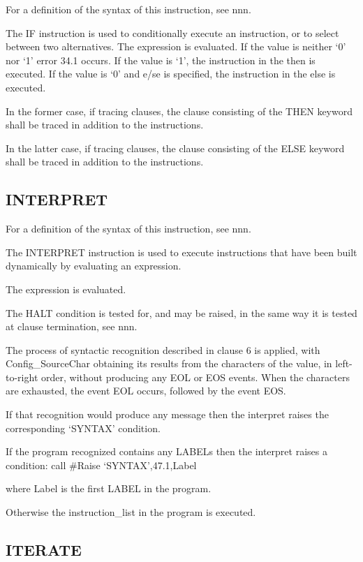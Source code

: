 For a definition of the syntax of this instruction, see nnn.

The IF instruction is used to conditionally execute an instruction, or
to select between two alternatives. The expression is evaluated. If the
value is neither `0' nor `1' error 34.1 occurs. If the value is `1', the
instruction in the then is executed. If the value is `0' and e/se is
specified, the instruction in the else is executed.

In the former case, if tracing clauses, the clause consisting of the
THEN keyword shall be traced in addition to the instructions.

In the latter case, if tracing clauses, the clause consisting of the
ELSE keyword shall be traced in addition to the instructions.

\hypertarget{interpret}{%
\subsection{INTERPRET}\label{interpret}}

For a definition of the syntax of this instruction, see nnn.

The INTERPRET instruction is used to execute instructions that have been
built dynamically by evaluating an expression.

The expression is evaluated.

The HALT condition is tested for, and may be raised, in the same way it
is tested at clause termination, see nnn.

The process of syntactic recognition described in clause 6 is applied,
with Config\_SourceChar obtaining its results from the characters of the
value, in left-to-right order, without producing any EOL or EOS events.
When the characters are exhausted, the event EOL occurs, followed by the
event EOS.

If that recognition would produce any message then the interpret raises
the corresponding `SYNTAX' condition.

If the program recognized contains any LABELs then the interpret raises
a condition: call \#Raise `SYNTAX',47.1,Label

where Label is the first LABEL in the program.

Otherwise the instruction\_list in the program is executed.

\hypertarget{iterate}{%
\subsection{ITERATE}\label{iterate}}

